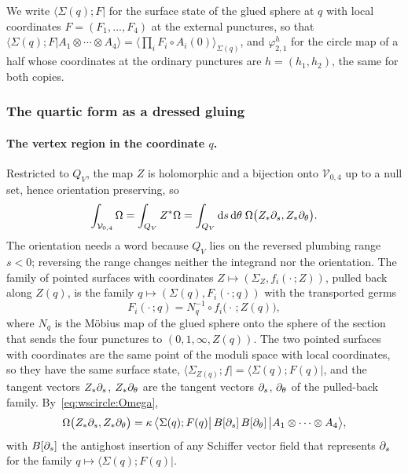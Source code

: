 We write $\langle \Sigma(q); F |$ for the surface state of the glued sphere at $q$ with local coordinates $F = (F_1, \dots, F_4)$ at the external punctures, so that $\langle \Sigma(q); F | A_1 \otimes \cdots \otimes A_4 \rangle = \langle \prod_i F_i \circ A_i(0) \rangle_{\Sigma(q)}$, and $\varphi^h_{2,1}$ for the circle map of a half whose coordinates at the ordinary punctures are $h = (h_1, h_2)$, the same for both copies.

\subsubsection{The quartic form as a dressed gluing}
\label{sec:wscircle:theorem}

\paragraph{The vertex region in the coordinate \texorpdfstring{$q$}{q}.}
Restricted to $Q_V$, the map $Z$ is holomorphic and a bijection onto $\mathcal V_{0,4}$ up to a null set, hence orientation preserving, so
\begin{equation}
  \label{eq:wscircle:pullback}
  \int_{\mathcal V_{0,4}} \Omega
    = \int_{Q_V} Z^* \Omega
    = \int_{Q_V} \mathrm{d} s \, \mathrm{d}\theta \; \Omega \big( Z_* \partial_s, Z_* \partial_\theta \big).
\end{equation}
The orientation needs a word because $Q_V$ lies on the reversed plumbing range $s < 0$; reversing the range changes neither the integrand nor the orientation.
The family of pointed surfaces with coordinates $Z \mapsto (\Sigma_Z, f_i(\cdot \,; Z))$, pulled back along $Z(q)$, is the family $q \mapsto (\Sigma(q), F_i(\cdot \,; q))$ with the transported germs
\begin{equation}
  \label{eq:wscircle:transport}
  F_i(\cdot \,; q)
    = N_q^{-1} \circ f_i \big( \cdot \,; Z(q) \big),
\end{equation}
where $N_q$ is the Möbius map of the glued sphere onto the sphere of the section that sends the four punctures to $(0, 1, \infty, Z(q))$.
The two pointed surfaces with coordinates are the same point of the moduli space with local coordinates, so they have the same surface state, $\langle \Sigma_{Z(q)}; f | = \langle \Sigma(q); F(q) |$, and the tangent vectors $Z_* \partial_s$, $Z_* \partial_\theta$ are the tangent vectors $\partial_s$, $\partial_\theta$ of the pulled-back family.
By~\eqref{eq:wscircle:Omega},
\begin{equation}
  \label{eq:wscircle:Omega-q}
  \Omega \big( Z_* \partial_s, Z_* \partial_\theta \big)
    = \kappa \, \big\langle \Sigma(q); F(q) \big| \, B[\partial_s] \, B[\partial_\theta] \, \big| A_1 \otimes \cdots \otimes A_4 \big\rangle,
\end{equation}
with $B[\partial_s]$ the antighost insertion of any Schiffer vector field that represents $\partial_s$ for the family $q \mapsto \langle \Sigma(q); F(q) |$.

